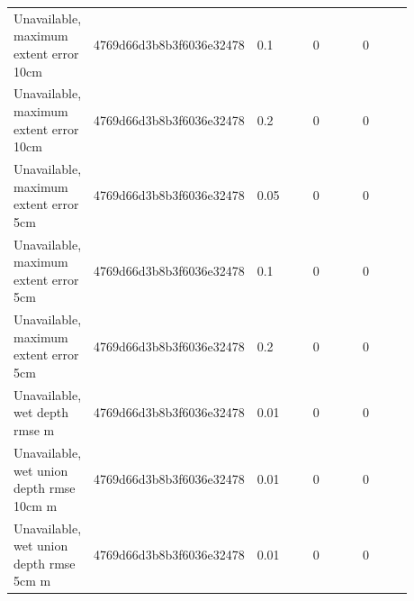 \begin{longtable}{p{0.1760\linewidth}p{0.1760\linewidth}p{0.1760\linewidth}p{0.1760\linewidth}p{0.1760\linewidth}}
Unavailable, maximum extent error 10cm & 4769d66d3b8b3f6036e32478 & 0.1 & 0 & 0 \\
Unavailable, maximum extent error 10cm & 4769d66d3b8b3f6036e32478 & 0.2 & 0 & 0 \\
Unavailable, maximum extent error 5cm & 4769d66d3b8b3f6036e32478 & 0.05 & 0 & 0 \\
Unavailable, maximum extent error 5cm & 4769d66d3b8b3f6036e32478 & 0.1 & 0 & 0 \\
Unavailable, maximum extent error 5cm & 4769d66d3b8b3f6036e32478 & 0.2 & 0 & 0 \\
Unavailable, wet depth rmse m & 4769d66d3b8b3f6036e32478 & 0.01 & 0 & 0 \\
Unavailable, wet union depth rmse 10cm m & 4769d66d3b8b3f6036e32478 & 0.01 & 0 & 0 \\
Unavailable, wet union depth rmse 5cm m & 4769d66d3b8b3f6036e32478 & 0.01 & 0 & 0 \\
\end{longtable}

